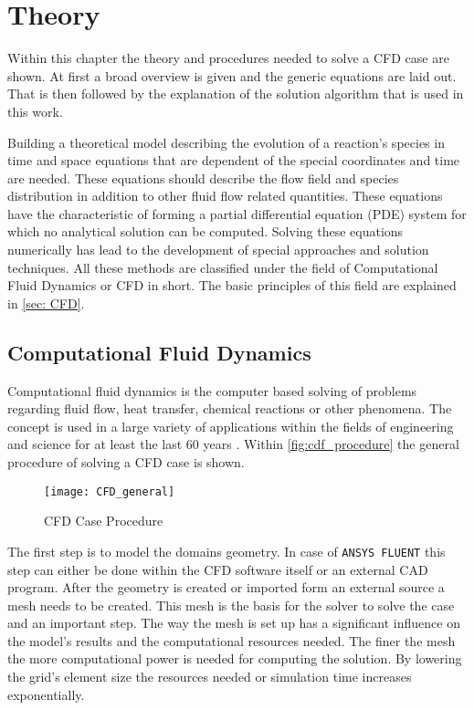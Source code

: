 \documentclass[../thesis.tex]{subfiles}
\begin{document}
\chapter{Theory}
\label{chp:theory}

Within this chapter the theory and procedures needed to solve a CFD case are shown. At first a broad overview is given and the generic equations are laid out. That is then followed by the explanation of the solution algorithm that is used in this work.

Building a theoretical model describing the evolution of a reaction's species in time and space equations that are dependent of the special coordinates and time are needed. These equations should describe the flow field and species distribution in addition to other fluid flow related quantities. These equations have the characteristic of forming a partial differential equation (PDE) system for which no analytical solution can be computed. Solving these equations numerically has lead to the development of special approaches and solution techniques. All these methods are classified under the field of Computational Fluid Dynamics or CFD in short. The basic principles of this field are explained in \autoref{sec: CFD}. 
 
\section{Computational Fluid Dynamics}
\label{sec: CFD}

Computational fluid dynamics is the computer based solving of problems regarding fluid flow, heat transfer, chemical reactions or other phenomena. The concept is used in a large variety of applications within the fields of engineering and science for at least the last 60 years \cite{versteeg2007introduction}. Within \autoref{fig:cdf_procedure} the general procedure of solving a CFD case is shown.
\begin{figure}[htbp]
	\centering
	\texttt{[image: CFD\_general]}
	\caption{CFD Case Procedure}
	\label{fig:cdf_procedure}
\end{figure}

The first step is to model the domains geometry. In case of \texttt{ANSYS FLUENT} this step can either be done within the CFD software itself or an external CAD program. After the geometry is created or imported form an external source a mesh needs to be created. This mesh is the basis for the solver to solve the case and an important step. The way the mesh is set up has a significant influence on the model's results and the computational resources needed. The finer the mesh the more computational power is needed for computing the solution. By lowering the grid's element size the resources needed or simulation time increases exponentially.
\end{document}
